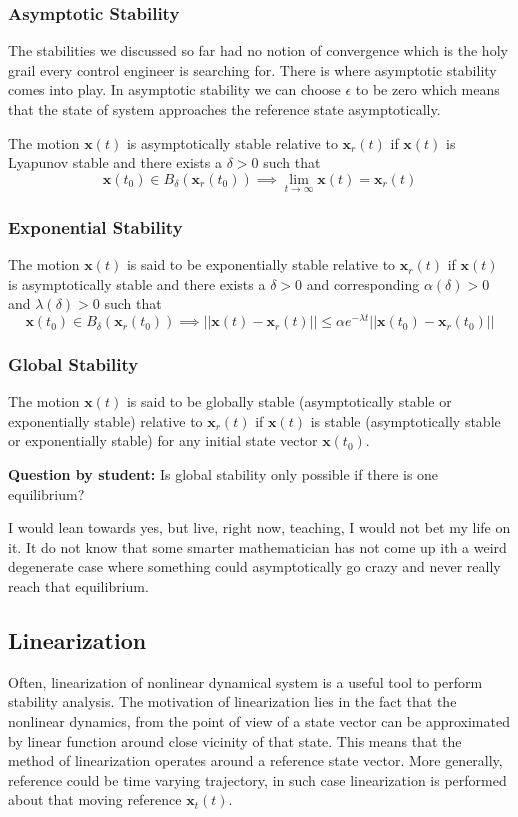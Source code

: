 \documentclass{article}
\begin{document}
\subsubsection*{Asymptotic Stability}
The stabilities we discussed so far had no notion of convergence which is the holy grail every control engineer is searching for. There is where asymptotic stability comes into play. In asymptotic stability we can choose $\epsilon$ to be zero which means that the state of system approaches the reference state asymptotically.

The motion $\bm{x}(t)$ is asymptotically stable relative to $\bm{x}_{r}(t)$ if $\bm{x}(t)$ is Lyapunov stable and there exists a $\delta>0$ such that
$$
\bm{x}(t_{0})\in B_{\delta}(\bm{x}_{r}(t_{0}))\implies \lim_{t\rightarrow \infty}\bm{x}(t)=\bm{x}_{r}(t)
$$

\subsubsection*{Exponential Stability}
The motion $\bm{x}(t)$ is said to be exponentially stable relative to $\bm{x}_{r}(t)$ if $\bm{x}(t)$ is asymptotically stable and there exists a $\delta>0$ and corresponding $\alpha (\delta)>0$ and $\lambda(\delta)>0$ such that
$$
\bm{x}(t_{0})\in B_{\delta}(\bm{x}_{r}(t_{0}))\implies|\!|\bm{x}(t)-\bm{x}_{r}(t)|\!|\leq \alpha e^{-\lambda t}|\!|\bm{x}(t_{0})-\bm{x}_{r}(t_{0})|\!|
$$

\subsubsection*{Global Stability}
The motion $\bm{x}(t)$ is said to be globally stable (asymptotically  stable or exponentially stable) relative to $\bm{x}_{r}(t)$ if $\bm{x}(t)$ is stable (asymptotically stable or exponentially stable) for any initial state vector $\bm{x}(t_{0})$.

\textbf{Question by student:} Is global stability only possible if there is one equilibrium?

I would lean towards yes, but live, right now, teaching, I would not bet my life on it. It do not know that some smarter mathematician has not come up ith a weird degenerate case where something could asymptotically go crazy and never really reach that equilibrium.

\subsection{Linearization}
Often, linearization of nonlinear dynamical system is a useful tool to perform stability analysis. The motivation of linearization lies in the fact that the nonlinear dynamics, from the point of view of a state vector can be approximated by linear function around close vicinity of that state. This means that the method of linearization operates around a reference state vector. More generally, reference could be time varying trajectory, in such case linearization is performed about that moving reference $\bm{x}_{t}(t)$.
\end{document}
